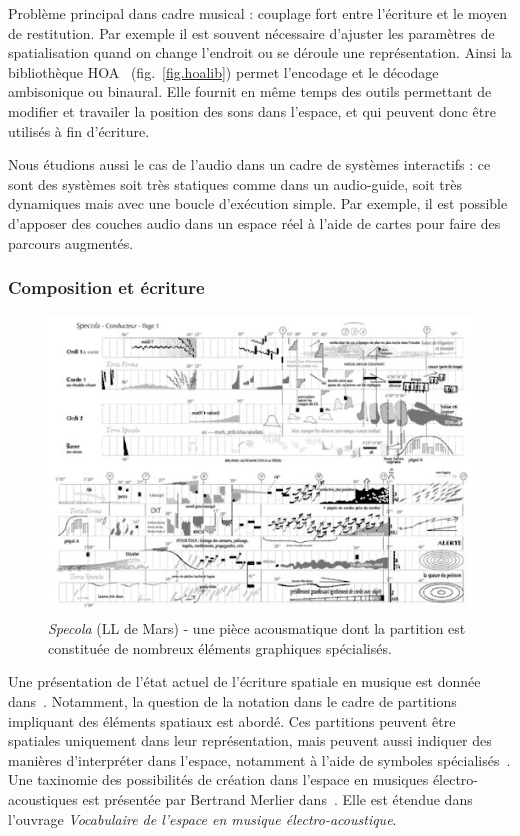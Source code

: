 \documentclass[french,12pt]{article}
\begin{document}
Problème principal dans cadre musical : couplage fort entre l'écriture et le moyen de restitution. 
Par exemple il est souvent nécessaire d'ajuster les paramètres de spatialisation quand on change l'endroit ou se déroule une représentation. %
Ainsi la bibliothèque HOA~\cite{colafrancesco_bibliotheque_2013} (fig.~\ref{fig.hoalib}) permet l'encodage et le décodage ambisonique ou binaural. 
Elle fournit en même temps des outils permettant de modifier et travailer la position des sons dans l'espace, et qui peuvent donc être utilisés à fin d'écriture.

Nous étudions aussi le cas de l'audio dans un cadre de systèmes interactifs : ce sont des systèmes soit très statiques comme dans un audio-guide, soit très dynamiques mais avec une boucle d'exécution simple.
Par exemple, il est possible d'apposer des couches audio dans un espace réel à l'aide de cartes pour faire des parcours\cite{lemordant_augmented_2010} augmentés. 

\subsubsection{Composition et écriture}
\begin{figure}[h]
    \centering
    \includegraphics[scale=0.5]{images/specola.jpg}
    \caption{\textit{Specola} (LL de Mars) - une pièce acousmatique dont la partition est constituée de nombreux éléments graphiques spécialisés.}
    \label{fig.specola}
\end{figure}

Une présentation de l'état actuel de l'écriture spatiale en musique est donnée dans~\cite{fober_les_2015}. Notamment, la question de la notation dans le cadre de partitions impliquant des éléments spatiaux est abordé. %
Ces partitions peuvent être spatiales uniquement dans leur représentation, mais peuvent aussi indiquer des manières d'interpréter dans l'espace, notamment à l'aide de symboles spécialisés~\cite{ellberger_spatialization_2014}. Une taxinomie des possibilités de création dans l'espace en musiques électro-acoustiques est présentée par Bertrand Merlier dans~\cite{merlier_vocabulaire_2006}. Elle est étendue dans l'ouvrage \textit{Vocabulaire de l'espace en musique électro-acoustique\cite{merlier_vocabulaire_2006_book}}.
\end{document}
